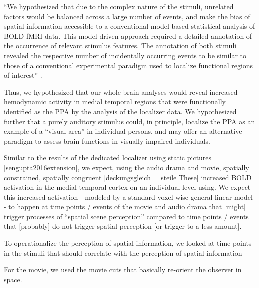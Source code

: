 ``We hypothesized that due to the complex nature of the stimuli, unrelated
factors would be balanced across a large number of events, and make the bias of
spatial information accessible to a conventional model-based statistical
analysis of BOLD fMRI data.
This model-driven approach required a detailed annotation of the occurrence of
relevant stimulus features.
The annotation of both stimuli revealed the respective number of incidentally
occurring events to be similar to those of a conventional experimental paradigm
used to localize functional regions of interest''
\citep{haeusler2022processing}.

Thus, we hypothesized that our whole-brain analyses would reveal increased
hemodynamic activity in medial temporal regions that were functionally
identified as the PPA by the analysis of the localizer data.
We hypothesized further that a purely auditory stimulus could, in principle,
localize the PPA as an example of a ``visual area'' in individual persons,
and may offer an alternative paradigm to assess brain functions in visually
impaired individuals.


%
Similar to the results of the dedicated localizer using static pictures
[sengupta2016extension], we expect, using the audio drama and movie, spatially
constrained, spatially congruent [deckungsgleich = steile These] increased BOLD
activation in the medial temporal cortex on an individual level using. We expect
this increased activation - modeled by a standard voxel-wise general linear
model - to happen at time points / events of the movie and audio drama that
[might] trigger processes of “spatial scene perception” compared to time points
/ events that [probably] do not trigger spatial perception [or trigger to a less
amount].

To operationalize the perception of spatial information, we looked at time
points in the stimuli that should correlate with the perception of spatial
information

%
For the movie, we used the movie cuts that basically re-orient the observer in
space.

